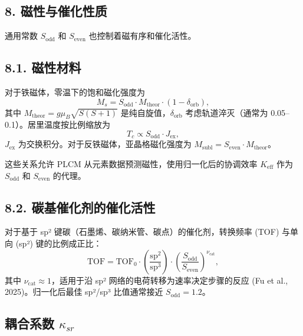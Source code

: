 \documentclass[12pt,a4paper]{article}
\begin{document}
	
	
	\subsection*{8. 磁性与催化性质}
	
	通用常数 \(S_{\text{odd}}\) 和 \(S_{\text{even}}\) 也控制着磁有序和催化活性。
	
	\subsection*{8.1. 磁性材料}
	对于铁磁体，零温下的饱和磁化强度为
	\[
	M_s = S_{\text{odd}} \cdot M_{\text{theor}} \cdot (1 - \delta_{\text{orb}}),
	\]
	其中 \(M_{\text{theor}} = g \mu_B \sqrt{S(S+1)}\) 是纯自旋值，\(\delta_{\text{orb}}\) 考虑轨道淬灭（通常为 0.05–0.1）。居里温度按比例缩放为
	\[
	T_c \propto S_{\text{odd}} \cdot J_{\text{ex}},
	\]
	\(J_{\text{ex}}\) 为交换积分。对于反铁磁体，亚晶格磁化强度为 \(M_{\text{subl}} = S_{\text{even}} \cdot M_{\text{theor}}\)。
	
	这些关系允许 PLCM 从元素数据预测磁性，使用归一化后的协调效率 \(K_{\text{eff}}\) 作为 \(S_{\text{odd}}\) 和 \(S_{\text{even}}\) 的代理。
	
	\subsection*{8.2. 碳基催化剂的催化活性}
	对于基于 sp² 键碳（石墨烯、碳纳米管、碳点）的催化剂，转换频率 (TOF) 与单向 (sp²) 键的比例成正比：
	\[
	\text{TOF} = \text{TOF}_0 \cdot \left( \frac{\text{sp}^2}{\text{sp}^3} \right) \cdot \left( \frac{S_{\text{odd}}}{S_{\text{even}}} \right)^{\nu_{\text{cat}}},
	\]
	其中 \(\nu_{\text{cat}} \approx 1\)，适用于沿 sp² 网络的电荷转移为速率决定步骤的反应 (Fu et al., 2025)。归一化后最佳 sp²/sp³ 比值通常接近 \(S_{\text{odd}} = 1.2\)。
	
	\subsection{耦合系数 \(\kappa_{sr}\)}
	
\end{document}
